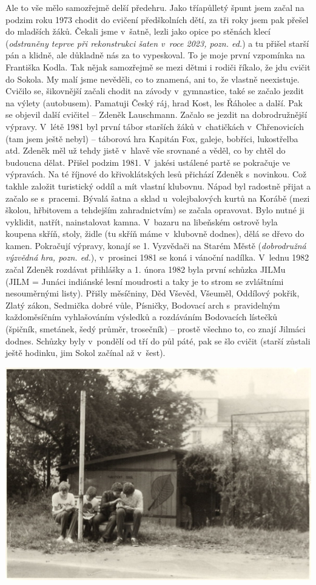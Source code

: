 \documentclass[a5paper, 11pt, twoside]{article}
\begin{document}
Ale to vše mělo samozřejmě delší předehru. Jako tříapůlletý špunt jsem
začal na podzim roku 1973 chodit do cvičení předškolních dětí, za tři
roky jsem pak přešel do mladších žáků. Čekali jsme v~šatně, lezli jako
opice po stěnách klecí (\textit{odstraněny teprve při rekonstrukci šaten
v~roce 2023, pozn. ed.}) a tu přišel starší pán a klidně, ale důkladně nás
za to vypeskoval. To je moje první vzpomínka na Františka Kodla. Tak
nějak samozřejmě se mezi dětmi i rodiči říkalo, že jdu cvičit do Sokola.
My malí jsme nevěděli, co to znamená, ani to, že vlastně neexistuje.
Cvičilo se, šikovnější začali chodit na závody v~gymnastice, také se
začalo jezdit na výlety (autobusem). Pamatuji Český ráj, hrad Kost, les
Řáholec a další. Pak se objevil další cvičitel -- Zdeněk Lauschmann.
Začalo se jezdit na dobrodružnější výpravy. V~létě 1981 byl první tábor
starších žáků v~chatičkách v~Chřenovicích (tam jsem ještě nebyl) --
táborová hra Kapitán Fox, galeje, bobříci, lukostřelba atd. Zdeněk měl
už tehdy jistě v~hlavě vše srovnané a věděl, co by chtěl do budoucna
dělat. Přišel podzim 1981. V~jakési ustálené partě se pokračuje ve
výpravách. Na té říjnové do křivoklátských lesů přichází Zdeněk
s~novinkou. Což takhle založit turistický oddíl a mít vlastní klubovnu.
Nápad byl radostně přijat a začalo se s~pracemi. Bývalá šatna a sklad
u~volejbalových kurtů na Korábě (mezi školou, hřbitovem a tehdejším
zahradnictvím) se začala opravovat. Bylo nutné ji vyklidit, natřít,
nainstalovat kamna. V~bazaru na libeňském ostrově byla koupena skříň,
stoly, židle (tu skříň máme v~klubovně dodnes), dělá se dřevo do kamen.
Pokračují výpravy, konají se 1. Vyzvědači na Starém Městě
(\textit{dobrodružná výzvědná hra, pozn. ed.}), v~prosinci 1981 se koná i
vánoční nadílka. V~lednu 1982 začal Zdeněk rozdávat přihlášky a 1. února
1982 byla první schůzka JILMu (JILM = Junáci indiánské lesní moudrosti a
taky je to strom se zvláštními nesouměrnými listy). Přišly měsíčniny,
Děd Vševěd, Všeuměl, Oddílový pokřik, Zlatý zákon, Sedmička dobré vůle,
Písničky, Bodovací arch s~pravidelným každoměsíčním vyhlašováním
výsledků a rozdáváním Bodovacích lístečků (špičník, smetánek, šedý
průměr, trosečník) -- prostě všechno to, co znají Jilmáci dodnes.
Schůzky byly v~pondělí od tří do půl páté, pak se šlo cvičit (starší
zůstali ještě hodinku, jim Sokol začínal až v~šest).

 \includegraphics[width=\textwidth]{img/77_klubovna_jilm.jpg}
\end{document}
